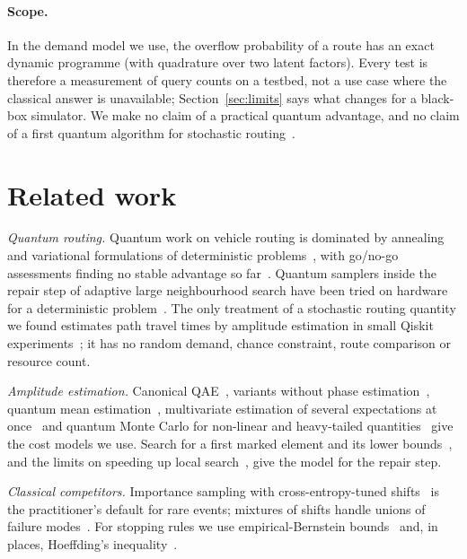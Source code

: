 \documentclass[pdflatex,sn-mathphys-num]{sn-jnl}
\theoremstyle{thmstyleone}
\theoremstyle{thmstyletwo}
\begin{document}
\paragraph{Scope.} In the demand model we use, the overflow probability of a route has an exact dynamic programme (with quadrature over two latent factors). Every test is therefore a measurement of query counts on a testbed, not a use case where the classical answer is unavailable; Section~\ref{sec:limits} says what changes for a black-box simulator. We make no claim of a practical quantum advantage, and no claim of a first quantum algorithm for stochastic routing~\cite{WangFilipovska2026}.

\section{Related work}\label{sec:related}

\emph{Quantum routing.} Quantum work on vehicle routing is dominated by annealing and variational formulations of deterministic problems~\cite{Feld2019,Harwood2021,Osaba2022,Azad2023}, with go/no-go assessments finding no stable advantage so far~\cite{Onah2025RequirementsCVRP,xu2026urban}. Quantum samplers inside the repair step of adaptive large neighbourhood search have been tried on hardware for a deterministic problem~\cite{Moosavi2026RLQALNS}. The only treatment of a stochastic routing quantity we found estimates path travel times by amplitude estimation in small Qiskit experiments~\cite{WangFilipovska2026}; it has no random demand, chance constraint, route comparison or resource count.

\emph{Amplitude estimation.} Canonical QAE~\cite{Brassard2002}, variants without phase estimation~\cite{Suzuki2020,Grinko2021}, quantum mean estimation~\cite{Montanaro2015,KothariODonnell2023}, multivariate estimation of several expectations at once~\cite{Huggins2022,vanApeldoorn2021,Cornelissen2022,Tang2025} and quantum Monte Carlo for non-linear and heavy-tailed quantities~\cite{Blanchet2025} give the cost models we use. Search for a first marked element and its lower bounds~\cite{grover1996fast,boyer1998tight,DurrHoyer1996,hoyer2003bounded}, and the limits on speeding up local search~\cite{Aaronson2006}, give the model for the repair step.

\emph{Classical competitors.} Importance sampling with cross-entropy-tuned shifts~\cite{deBoer2005} is the practitioner's default for rare events; mixtures of shifts handle unions of failure modes~\cite{Glasserman2005,Owen2019}. For stopping rules we use empirical-Bernstein bounds~\cite{Audibert2009,Maurer2009} and, in places, Hoeffding's inequality~\cite{Hoeffding1963}.
\end{document}
